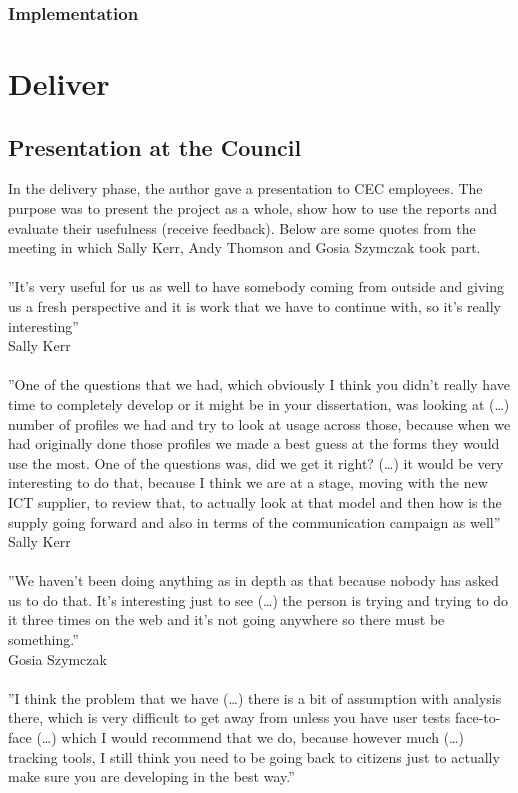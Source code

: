 			\subsubsection{Implementation}
	
	\section{Deliver}
	
		\subsection{Presentation at the Council}
		
In the delivery phase, the author gave a presentation to CEC employees. The purpose was to present the project as a whole, show how to use the reports and evaluate their usefulness (receive feedback). Below are some quotes from the meeting in which Sally Kerr, Andy Thomson and Gosia Szymczak took part.\\\\
''It’s very useful for us as well to have somebody coming from outside and giving us a fresh perspective and it is work that we have to continue with, so it’s really interesting''\\
Sally Kerr\\\\
''One of the questions that we had, which obviously I think you didn’t really have time to completely develop or it might be in your dissertation, was looking at (…) number of profiles we had and try to look at usage across those, because when we had originally done those profiles we made a best guess at the forms they would use the most. One of the questions was, did we get it right? (…) it would be very interesting to do that, because I think we are at a stage, moving with the new ICT supplier, to review that, to actually look at that model and then how is the supply going forward and also in terms of the communication campaign as well''\\
Sally Kerr\\\\
''We haven’t been doing anything as in depth as that because nobody has asked us to do that. It’s interesting just to see (…) the person is trying and trying to do it three times on the web and it’s not going anywhere so there must be something.''\\
Gosia Szymczak\\\\
''I think the problem that we have (…) there is a bit of assumption with analysis there, which is very difficult to get away from unless you have user tests face-to-face (…) which I would recommend that we do, because however much (…) tracking tools, I still think you need to be going back to citizens just to actually make sure you are developing in the best way.''\\
